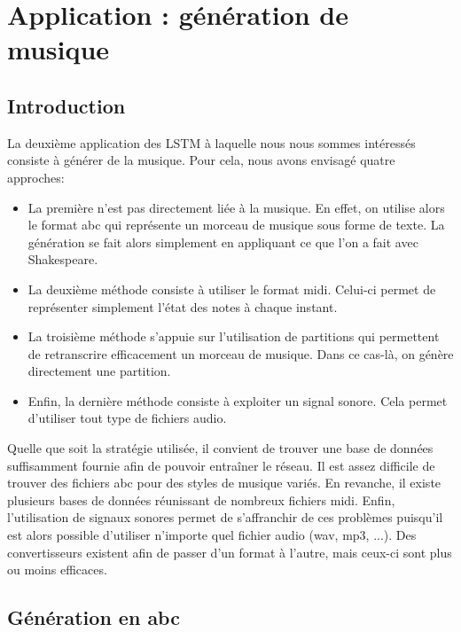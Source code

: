 \chapter{Application : génération de musique}

\section{Introduction}

La deuxième application des LSTM à laquelle nous nous sommes intéressés consiste à générer de la musique. Pour cela, nous avons envisagé quatre approches:
\begin{itemize}
\item La première n'est pas directement liée à la musique. En effet, on utilise alors le format abc qui représente un morceau de musique sous forme de texte. La génération se fait alors simplement en appliquant ce que l'on a fait avec Shakespeare.

\item La deuxième méthode consiste à utiliser le format midi. Celui-ci permet de représenter simplement l'état des notes à chaque instant.

\item La troisième méthode s'appuie sur l'utilisation de partitions qui permettent de retranscrire efficacement un morceau de musique. Dans ce cas-là, on génère directement une partition.

\item Enfin, la dernière méthode consiste à exploiter un signal sonore. Cela permet d'utiliser tout type de fichiers audio.
\end{itemize}     

Quelle que soit la stratégie utilisée, il convient de trouver une base de données suffisamment fournie afin de pouvoir entraîner le réseau. Il est assez difficile de trouver des fichiers abc pour des styles de musique variés. En revanche, il existe plusieurs bases de données réunissant de nombreux fichiers midi. Enfin, l'utilisation de signaux sonores permet de s'affranchir de ces problèmes puisqu'il est alors possible d'utiliser n'importe quel fichier audio (wav, mp3, ...). Des convertisseurs existent afin de passer d'un format à l'autre, mais ceux-ci sont plus ou moins efficaces.

\section{Génération en abc}


